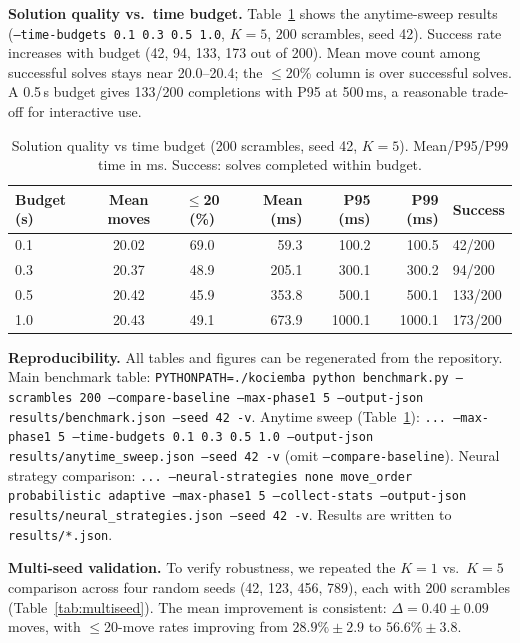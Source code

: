 \documentclass[10pt,twocolumn,a4paper]{article}
\begin{document}
\textbf{Solution quality vs.\ time budget.} Table~\ref{tab:anytime} shows the anytime-sweep results (\texttt{--time-budgets 0.1 0.3 0.5 1.0}, $K{=}5$, 200 scrambles, seed 42). Success rate increases with budget (42, 94, 133, 173 out of 200). Mean move count among successful solves stays near 20.0--20.4; the $\leq$20\% column is over successful solves. A 0.5\,s budget gives 133/200 completions with P95 at 500\,ms, a reasonable trade-off for interactive use.

\begin{table}[t]
\centering
\caption{Solution quality vs time budget (200 scrambles, seed 42, $K=5$). Mean/P95/P99 time in ms. Success: solves completed within budget.}
\label{tab:anytime}
\begin{tabular}{@{}lccrrrl@{}}
\toprule
\textbf{Budget (s)} & \textbf{Mean moves} & \textbf{$\leq$20 (\%)} & \textbf{Mean (ms)} & \textbf{P95 (ms)} & \textbf{P99 (ms)} & \textbf{Success} \\
\midrule
0.1 & 20.02 & 69.0 & 59.3 & 100.2 & 100.5 & 42/200 \\
0.3 & 20.37 & 48.9 & 205.1 & 300.1 & 300.2 & 94/200 \\
0.5 & 20.42 & 45.9 & 353.8 & 500.1 & 500.1 & 133/200 \\
1.0 & 20.43 & 49.1 & 673.9 & 1000.1 & 1000.1 & 173/200 \\
\bottomrule
\end{tabular}
\end{table}

\textbf{Reproducibility.} All tables and figures can be regenerated from the repository. Main benchmark table: \texttt{PYTHONPATH=./kociemba python benchmark.py --scrambles 200 --compare-baseline --max-phase1 5 --output-json results/benchmark.json --seed 42 -v}. Anytime sweep (Table~\ref{tab:anytime}): \texttt{... --max-phase1 5 --time-budgets 0.1 0.3 0.5 1.0 --output-json results/anytime\_sweep.json --seed 42 -v} (omit \texttt{--compare-baseline}). Neural strategy comparison: \texttt{... --neural-strategies none move\_order probabilistic adaptive --max-phase1 5 --collect-stats --output-json results/neural\_strategies.json --seed 42 -v}. Results are written to \texttt{results/*.json}.

\textbf{Multi-seed validation.} To verify robustness, we repeated the $K{=}1$ vs.\ $K{=}5$ comparison across four random seeds (42, 123, 456, 789), each with 200 scrambles (Table~\ref{tab:multiseed}). The mean improvement is consistent: $\Delta = 0.40 \pm 0.09$ moves, with $\leq$20-move rates improving from $28.9\% \pm 2.9$ to $56.6\% \pm 3.8$.
\end{document}
